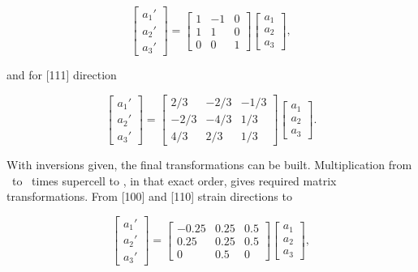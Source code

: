 \begin{equation}
\label{Eq:app_100_inv}
\begin{bmatrix}
a_1' \\ a_2' \\ a_3'
\end{bmatrix}=
\begin{bmatrix}
1 & -1 & 0 \\
1 & 1 & 0 \\
0 & 0 & 1
\end{bmatrix}
\begin{bmatrix}
a_1 \\ a_2 \\ a_3
\end{bmatrix},
\end{equation}

and for [111] direction

\begin{equation}
\label{Eq:app_111_inv}
\begin{bmatrix}
a_1' \\ a_2' \\ a_3'
\end{bmatrix}=
\begin{bmatrix}
2/3 & -2/3 & -1/3 \\
-2/3 & -4/3 & 1/3 \\
4/3 & 2/3 & 1/3
\end{bmatrix}
\begin{bmatrix}
a_1 \\ a_2 \\ a_3
\end{bmatrix}.
\end{equation}

With inversions given, the final transformations can be built.
Multiplication from \conv\ to \prim\ times supercell to \conv, in that exact order, gives required matrix transformations.
From [100] and [110] strain directions to \prim

\begin{equation}
\label{Eq:app_100_final}
\begin{bmatrix}
a_1' \\ a_2' \\ a_3'
\end{bmatrix}=
\begin{bmatrix}
-0.25 & 0.25 & 0.5 \\
0.25 & 0.25 & 0.5 \\
0 & 0.5 & 0
\end{bmatrix}
\begin{bmatrix}
a_1 \\ a_2 \\ a_3
\end{bmatrix},
\end{equation}

